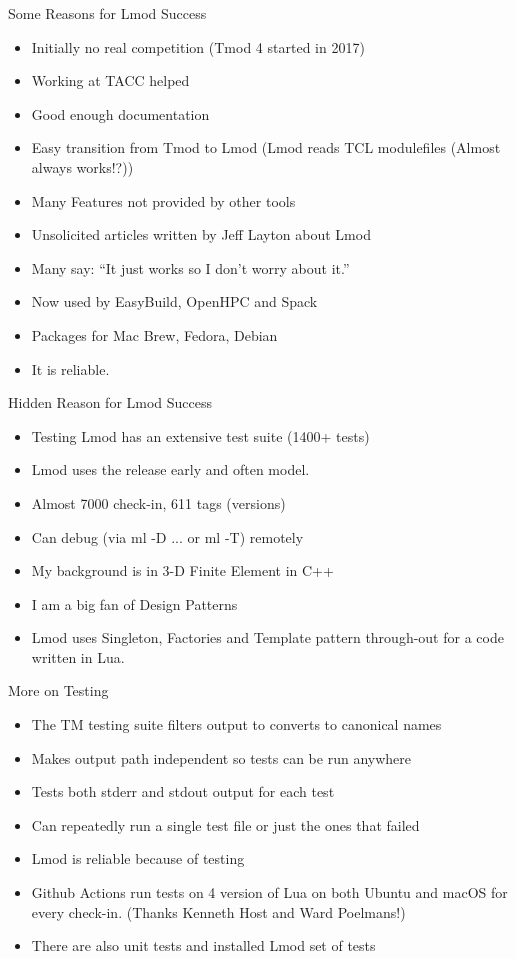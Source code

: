 \documentclass{beamer}
\begin{document}
\begin{frame}{Some Reasons for Lmod Success}
  \begin{itemize}
    \item Initially no real competition (Tmod 4 started in 2017)
    \item Working at TACC helped
    \item Good enough documentation
    \item Easy transition from Tmod to Lmod (Lmod reads TCL
      modulefiles (Almost always works!?))
    \item Many Features not provided by other tools
    \item Unsolicited articles written by Jeff Layton about Lmod
    \item Many say: ``It just works so I don't worry about it.''
    \item Now used by EasyBuild, OpenHPC and Spack
    \item Packages for Mac Brew, Fedora, Debian
    \item It is reliable.
  \end{itemize}
\end{frame}

\begin{frame}{Hidden Reason for Lmod Success}
  \begin{itemize}
    \item Testing Lmod has an extensive test suite (1400+ tests)
    \item Lmod uses the release early and often model.
    \item Almost 7000 check-in, 611 tags (versions)
    \item Can debug (via ml -D ... or ml -T) remotely
    \item My background is in 3-D Finite Element in C++
    \item I am a big fan of Design Patterns
    \item Lmod uses Singleton, Factories and Template pattern
      through-out for a code written in Lua.
  \end{itemize}
\end{frame}

\begin{frame}{More on Testing}
  \begin{itemize}
    \item The TM testing suite filters output to converts to canonical
      names
    \item Makes output path independent so tests can be run anywhere
    \item Tests both stderr and stdout output for each test
    \item Can repeatedly run a single test file or just the ones that
      failed
    \item Lmod is reliable because of testing
    \item Github Actions run tests on 4 version of Lua on both
      Ubuntu and macOS for every check-in. (Thanks Kenneth Host and
      Ward Poelmans!)
    \item There are also unit tests and installed Lmod set of tests
  \end{itemize}
\end{frame}
\end{document}
